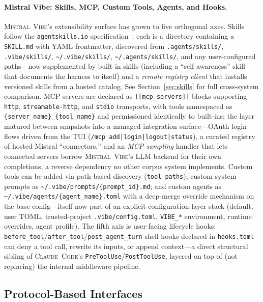 \documentclass[11pt,a4paper]{article}
\newcommand{\clcode}{\textsc{Claude~Code}\xspace}
\newcommand{\vibe}{\textsc{Mistral~Vibe}\xspace}
\begin{document}
\paragraph{Mistral Vibe: Skills, MCP, Custom Tools, Agents, and Hooks.}
\vibe{}'s extensibility surface has grown to five orthogonal axes.
Skills follow the \texttt{agentskills.io} specification~\cite{agentskills2025}: each is a directory containing a \texttt{SKILL.md} with YAML frontmatter, discovered from \texttt{.agents/skills/}, \texttt{.vibe/skills/}, \texttt{\textasciitilde/.vibe/skills/}, \texttt{\textasciitilde/.agents/skills/}, and any user-configured paths---now supplemented by built-in skills (including a ``self-awareness'' skill that documents the harness to itself) and a \emph{remote registry client} that installs versioned skills from a hosted catalog. See Section~\ref{sec:skills} for full cross-system comparison.
MCP servers are declared as \texttt{[[mcp\_servers]]} blocks supporting \texttt{http}, \texttt{streamable-http}, and \texttt{stdio} transports, with tools namespaced as \texttt{\{server\_name\}\_\{tool\_name\}} and permissioned identically to built-ins; the layer matured between snapshots into a managed integration surface---OAuth login flows driven from the TUI (\texttt{/mcp add|login|logout|status}), a curated registry of hosted Mistral ``connectors,'' and an \emph{MCP sampling} handler that lets connected servers borrow \vibe{}'s LLM backend for their own completions, a reverse dependency no other corpus system implements.
Custom tools can be added via path-based discovery (\texttt{tool\_paths}); custom system prompts as \texttt{\textasciitilde/.vibe/prompts/\{prompt\_id\}.md}; and custom agents as \texttt{\textasciitilde/.vibe/agents/\{agent\_name\}.toml} with a deep-merge override mechanism on the base config---itself now part of an explicit configuration-layer stack (default, user TOML, trusted-project \texttt{.vibe/config.toml}, \texttt{VIBE\_*} environment, runtime overrides, agent profile).
The fifth axis is user-facing lifecycle hooks: \texttt{before\_tool}/\texttt{after\_tool}/\texttt{post\_agent\_turn} shell hooks declared in \texttt{hooks.toml} can deny a tool call, rewrite its inputs, or append context---a direct structural sibling of \clcode{}'s \texttt{PreToolUse}/\texttt{PostToolUse}, layered on top of (not replacing) the internal middleware pipeline.

\subsection{Protocol-Based Interfaces}
\end{document}
